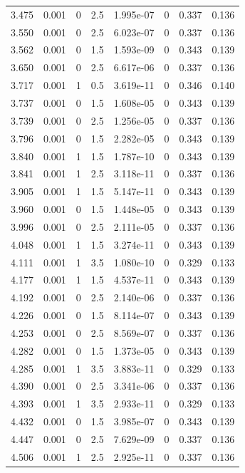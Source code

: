 \documentclass[preview]{standalone}
\begin{document}
{{{\begin{tabular}{L{1.2cm}C{1.2cm} C{0.3cm}C{0.5cm} C{1.4cm}C{1.4cm} C{1.4cm}C{1.4cm}}
  3.475  &  0.001  & 0     & 2.5 &  1.995e-07  & 0  & 0.337 &  0.136   \\ 
  3.550  &  0.001  & 0     & 2.5 &  6.023e-07  & 0  & 0.337 &  0.136   \\ 
  3.562  &  0.001  & 0     & 1.5 &  1.593e-09  & 0  & 0.343 &  0.139   \\ 
  3.650  &  0.001  & 0     & 2.5 &  6.617e-06  & 0  & 0.337 &  0.136   \\ 
  3.717  &  0.001  & 1     & 0.5 &  3.619e-11  & 0  & 0.346 &  0.140   \\ 
  3.737  &  0.001  & 0     & 1.5 &  1.608e-05  & 0  & 0.343 &  0.139   \\ 
  3.739  &  0.001  & 0     & 2.5 &  1.256e-05  & 0  & 0.337 &  0.136   \\ 
  3.796  &  0.001  & 0     & 1.5 &  2.282e-05  & 0  & 0.343 &  0.139   \\ 
  3.840  &  0.001  & 1     & 1.5 &  1.787e-10  & 0  & 0.343 &  0.139   \\ 
  3.841  &  0.001  & 1     & 2.5 &  3.118e-11  & 0  & 0.337 &  0.136   \\ 
  3.905  &  0.001  & 1     & 1.5 &  5.147e-11  & 0  & 0.343 &  0.139   \\ 
  3.960  &  0.001  & 0     & 1.5 &  1.448e-05  & 0  & 0.343 &  0.139   \\ 
  3.996  &  0.001  & 0     & 2.5 &  2.111e-05  & 0  & 0.337 &  0.136   \\ 
  4.048  &  0.001  & 1     & 1.5 &  3.274e-11  & 0  & 0.343 &  0.139   \\ 
  4.111  &  0.001  & 1     & 3.5 &  1.080e-10  & 0  & 0.329 &  0.133   \\ 
  4.177  &  0.001  & 1     & 1.5 &  4.537e-11  & 0  & 0.343 &  0.139   \\ 
  4.192  &  0.001  & 0     & 2.5 &  2.140e-06  & 0  & 0.337 &  0.136   \\ 
  4.226  &  0.001  & 0     & 1.5 &  8.114e-07  & 0  & 0.343 &  0.139   \\ 
  4.253  &  0.001  & 0     & 2.5 &  8.569e-07  & 0  & 0.337 &  0.136   \\ 
  4.282  &  0.001  & 0     & 1.5 &  1.373e-05  & 0  & 0.343 &  0.139   \\ 
  4.285  &  0.001  & 1     & 3.5 &  3.883e-11  & 0  & 0.329 &  0.133   \\ 
  4.390  &  0.001  & 0     & 2.5 &  3.341e-06  & 0  & 0.337 &  0.136   \\ 
  4.393  &  0.001  & 1     & 3.5 &  2.933e-11  & 0  & 0.329 &  0.133   \\ 
  4.432  &  0.001  & 0     & 1.5 &  3.985e-07  & 0  & 0.343 &  0.139   \\ 
  4.447  &  0.001  & 0     & 2.5 &  7.629e-09  & 0  & 0.337 &  0.136   \\ 
  4.506  &  0.001  & 1     & 2.5 &  2.925e-11  & 0  & 0.337 &  0.136   \\ 
\hline 
\end{tabular} 

}}}
\end{document}
